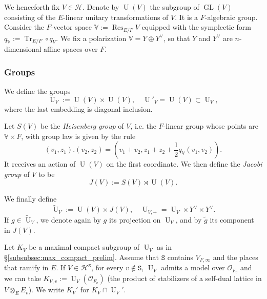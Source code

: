 \documentclass[letterpaper,11pt]{amsart}
\newcommand{\bV}{\mathbb{V}}
\newcommand{\cH}{\mathcal{H}}
\newcommand{\cO}{\mathcal{O}}
\newcommand{\tS}{\mathtt{S}}
\newcommand{\<}{\negthickspace}
\DeclareMathOperator{\Tr}{Tr}
\DeclareMathOperator{\GL}{GL}
\DeclareMathOperator{\U}{U}
\DeclareMathOperator{\Res}{Res}
\theoremstyle{definition}
\theoremstyle{plain}
\theoremstyle{remark}
\numberwithin{equation}{section}
\begin{document}
We henceforth fix $V \in \cH$. Denote by $\U(V)$ the subgroup of $\GL(V)$ consisting of the $E$-linear unitary transformations of $V$. It is a $F$-algebraic group. Consider the $F$-vector space $\mathbb{V}:=\Res_{E/F} V$ equipped with the symplectic form $q_{\mathbb{V}}:=\Tr_{E/F} \circ q_V$. We fix a polarization $\bV=Y\oplus Y^\vee$, so that $Y$ and $Y^\vee$ are $n$-dimensional affine spaces over $F$.

\subsubsection{Groups}

We define the groups
\begin{equation*}
    \U_V:=\U(V) \times \U(V), \quad \U'_V=\U(V) \subset \U_V,
\end{equation*}
where the last embedding is diagonal inclusion. 

Let $S(V)$ be the \emph{Heisenberg group} of $V$, i.e. the $F$-linear group whose points are $\bV \times F$, with group law is given by the rule
\begin{equation}
    \label{eq:Heisenberg_group}
    (v_1,z_1).(v_2,z_2)=\left(v_1+v_2,z_1+z_2+\frac{1}{2}q_{\bV}(v_1,v_2) \right).
\end{equation}
It receives an action of $\U(V)$ on the first coordinate. We then define the \emph{Jacobi group} of $V$ to be
\begin{equation*}
    J(V):=S(V) \rtimes \U(V).
\end{equation*}

We finally define
\begin{equation*}
    \widetilde{\U}_V:=\U(V) \times J(V), \quad \U_{V,+}=\U_V \times Y^\vee \times Y^\vee.
\end{equation*}
If $g \in \widetilde{\U}_V$, we denote again by $g$ its projection on $\U_V$, and by $\tilde{g}$ its component in $J(V)$.

\label{subsubsec:max_compact}
Let $K_V$ be a maximal compact subgroup of $\U_V$ as in \S\ref{subsubsec:max_compact_prelim}. Assume that $\tS$ contains $V_{F,\infty}$ and the places that ramify in $E$. If $V \in \cH^\tS$, for every $v \notin \tS$, $\U_V$ admits a model over $\cO_{F_v}$ and we can take $K_{V,v}:=\U_{V}(\cO_{F_v})$ (the product of stabilizers of a self-dual lattice in $V \otimes_E E_v$). We write $K_V'$ for $K_V \cap \U_V'$.
\end{document}
